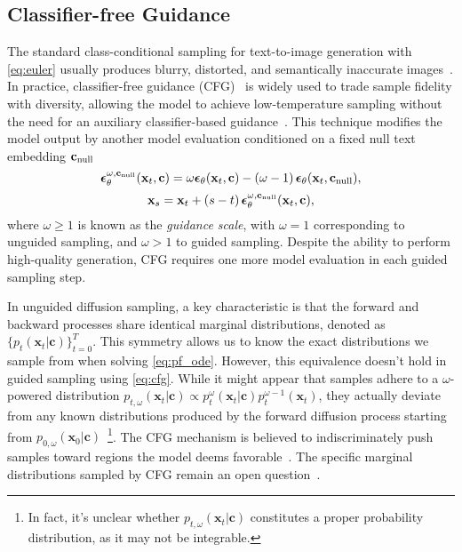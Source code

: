 \subsection{Classifier-free Guidance}
The standard class-conditional sampling for text-to-image generation with \cref{eq:euler} usually produces blurry, distorted, and semantically inaccurate images~\cite{meng2023distillation,karras2024guiding}.
In practice, classifier-free guidance (CFG)~\cite{ho2022classifier} is widely used to trade sample fidelity with diversity, allowing the model to achieve low-temperature sampling without the need for an auxiliary classifier-based guidance~\cite{dhariwal2021diffusion}. This technique modifies the model output by another model evaluation conditioned on a fixed null text embedding $\mathbf{c}_\text{null}$
\begin{equation}
    \label{eq:cfg}
    \boldsymbol{\epsilon}_{\theta}^{\omega,\mathbf{c}_\text{null}}(\mathbf{x}_t,\mathbf{c}) = \omega \boldsymbol{\epsilon}_{\theta}(\mathbf{x}_t,\mathbf{c}) - \left(\omega - 1\right)  \boldsymbol{\epsilon}_{\theta}(\mathbf{x}_t,\mathbf{c}_\text{null}),
\end{equation}
\begin{equation}
    \label{eq:euler_cfg}
    \mathbf{x}_s = \mathbf{x}_t + \left(s-t\right)\boldsymbol{\epsilon}_{\theta}^{\omega,\mathbf{c}_\text{null}}(\mathbf{x}_t,\mathbf{c}),
\end{equation}
where $\omega \geq 1$ is known as the \textit{guidance scale}, with $\omega=1$ corresponding to unguided sampling, and $\omega > 1$ to guided sampling. Despite the ability to perform high-quality generation, CFG requires one more model evaluation in each guided sampling step. 

In unguided diffusion sampling, a key characteristic is that the forward and backward processes share identical marginal distributions, denoted as $\{p_t(\mathbf{x}_t|\mathbf{c})\}_{t=0}^T$. This symmetry allows us to know the exact distributions we sample from when solving \cref{eq:pf_ode}. However, this equivalence doesn't hold in guided sampling using \cref{eq:cfg}. While it might appear that samples adhere to a $\omega$-powered distribution $p_{t,\omega}(\mathbf{x}_t|\mathbf{c}) \propto p_t^\omega(\mathbf{x}_t|\mathbf{c})p_t^{\omega-1}(\mathbf{x}_t)$, they actually deviate from any known distributions produced by the forward diffusion process starting from $p_{0,\omega}(\mathbf{x}_0|\mathbf{c})$~\cite{zheng2024characteristic}\footnote{In fact, it's unclear whether $p_{t,\omega}(\mathbf{x}_t|\mathbf{c})$ constitutes a proper probability distribution, as it may not be integrable.}. The CFG mechanism is believed to indiscriminately push samples toward regions the model deems favorable~\cite{karras2024guiding}. 
The specific marginal distributions sampled by CFG remain an open question~\cite{bradley2024classifier}.

